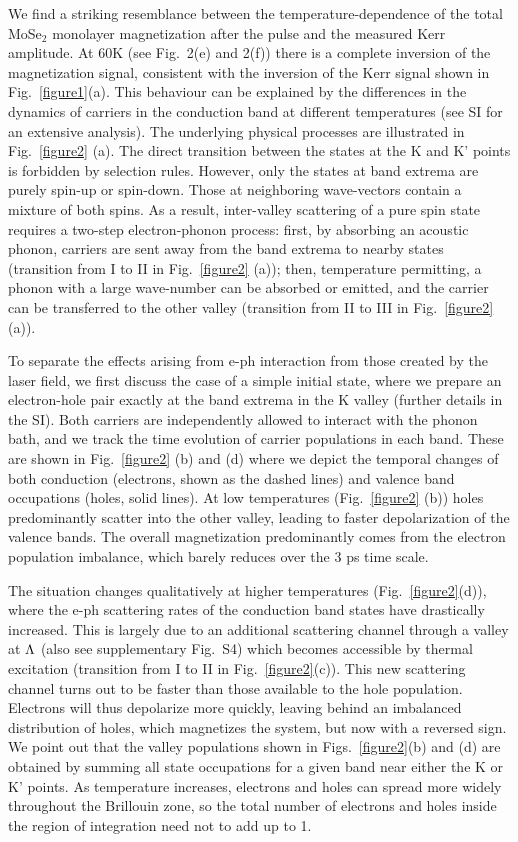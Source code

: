 \documentclass[prb,aps,superscriptaddress,reprint]{revtex4-1}
\begin{document}
We find a striking resemblance between the temperature-dependence of the total MoSe$_2$ monolayer magnetization after the pulse and the measured Kerr amplitude. At \unit{60}{K} (see Fig.~2(e) and 2(f)) there is a complete inversion of the magnetization signal, consistent with the inversion of the Kerr signal shown in Fig.~\ref{figure1}(a). This behaviour can be explained by the differences in the dynamics of carriers in the conduction band at different temperatures (see SI for an extensive analysis). 
%
The underlying physical processes are illustrated in Fig.~\ref{figure2} (a). The direct transition between the states at the K and K' points is forbidden by selection rules. However, only the states at band extrema are purely spin-up or spin-down. Those at neighboring wave-vectors contain a mixture of both spins. As a result, inter-valley scattering of a pure spin state requires a two-step electron-phonon process: first, by absorbing an acoustic phonon, carriers are sent away from the band extrema to nearby states (transition from I to II in Fig.~\ref{figure2} (a)); then, temperature permitting, a phonon with a large wave-number can be absorbed or emitted, and the carrier can be transferred to the other valley (transition from II to III in Fig.~\ref{figure2} (a)). 

To separate the effects arising from e-ph interaction from those created by the laser field, we first discuss the case of a simple initial state, where we prepare an electron-hole pair exactly at the band extrema in the K valley (further details in the SI). Both carriers are independently allowed to interact with the phonon bath, and we track the time evolution of carrier populations in each band. These are shown in Fig.~\ref{figure2} (b) and (d) where we depict the temporal changes of both conduction (electrons, shown as the dashed lines) and valence band occupations (holes, solid lines). At low temperatures (Fig.~\ref{figure2} (b)) holes predominantly scatter into the other valley, leading to faster depolarization of the valence bands. The overall magnetization predominantly comes from the electron population imbalance, which barely reduces over the 3 ps time scale. 

The situation changes qualitatively at higher temperatures (Fig.~\ref{figure2}(d)), where the e-ph scattering rates of the conduction band states have drastically increased. This is largely due to an additional scattering channel through a valley at $\Lambda$ (also see supplementary Fig.~S4) which becomes accessible by thermal excitation (transition from I to II in Fig.~\ref{figure2}(c)). This new scattering channel turns out to be faster than those available to the hole population. Electrons will thus depolarize more quickly, leaving behind an imbalanced distribution of holes, which magnetizes the system, but now with a reversed sign. We point out that the valley populations shown in Figs.~\ref{figure2}(b) and (d) are obtained by summing all state occupations for a given band near either the K or K' points. As temperature increases, electrons and holes can spread more widely throughout the Brillouin zone, so the total number of electrons and holes inside the region of integration need not to add up to 1. 
\end{document}
